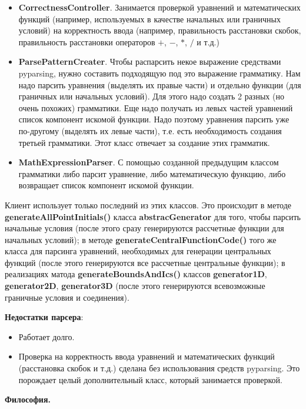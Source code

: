 \documentclass[a4paper]{article}
\begin{document}
\begin{itemize}
\item {\bf CorrectnessController}. Занимается проверкой уравнений и математических функций (например, используемых в качестве начальных или граничных условий) на корректность ввода (например, правильность расстановки скобок, правильность расстановки операторов $+$, $-$, $*$, $/$ и т.д.)
\item {\bf ParsePatternCreater}. Чтобы распарсить некое выражение средствами pyparsing, нужно составить подходящую под это выражение грамматику. Нам надо парсить уравнения (выделять их правые части) и отдельно функции (для граничных или начальных условий). Для этого надо создать 2 разных (но очень похожих) грамматики. Еще надо получать из левых частей уравнений список компонент искомой функции. Надо поэтому уравнения пар\-сить уже по-другому (выделять их левые части), т.е. есть необходимость создания третьей грамматики. Этот класс отвечает за создание этих грамматик.
\item {\bf MathExpressionParser}. С помощью созданной предыдущим классом грамматики либо парсит уравнение, либо математическую функцию, либо возвращает список компонент искомой функции.
\end{itemize}
Клиент использует только последний из этих классов. Это происходит в методе {\bf ge\-ne\-rateAll\-Po\-int\-Ini\-ti\-als()} класса {\bf ab\-strac\-Ge\-ne\-ra\-tor} для того, чтобы парсить начальные условия (после этого сразу генерируются рассчетные функции для начальных условий); в методе {\bf ge\-ne\-rate\-Cent\-ral\-Func\-ti\-on\-Co\-de()} того же класса для парсинга уравнений, необходимых для генерации центральных функций (после этого генерируются все рассчетные центральные функции); в реализациях матода {\bf generateBoundsAndIcs()} классов {\bf generator1D}, {\bf generator2D}, {\bf generator3D} (после этого генерируются всевозможные граничные условия и соединения).

\bigskip
{\bf Недостатки парсера}:
\begin{itemize}
\item Работает долго.
\item Проверка на корректность ввода уравнений и математических функ\-ций (расстановка скобок и т.д.) сделана без использования средств pyparsing. Это порождает целый дополнительный класс, который занимается проверкой.
\end{itemize}

{\bf Философия.}
\end{document}
